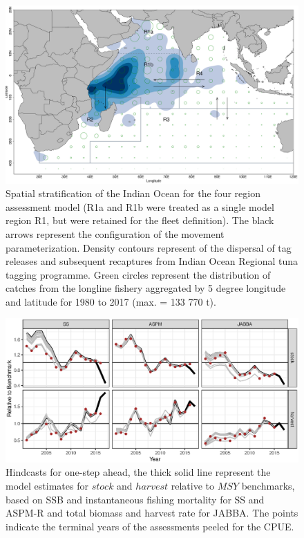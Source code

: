 \documentclass[11pt,a4paper]{article}
\begin{document}
{\begin{figure}[!ht]
\centering
\includegraphics[width=6in]{fig1.eps}
\caption{Spatial stratification of the Indian Ocean for the four region assessment model (R1a and R1b were treated as a single model region R1, but were retained for the fleet definition). The black arrows represent the configuration of the movement parameterization.  Density contours represent of the dispersal of tag releases and subsequent recaptures from Indian Ocean Regional tuna tagging programme. Green circles represent the distribution of catches from the longline fishery aggregated by 5 degree longitude and latitude for 1980 to 2017 (max. = 133 770 t).}
\label{fig:map}
\end{figure}


\begin{figure}
\centering
\includegraphics[width=6in]{fig2.eps}
\caption{Hindcasts for one-step ahead, the thick solid line represent the model estimates for $stock$ and $harvest$ relative to $MSY$ benchmarks, based on SSB and instantaneous fishing mortality for SS and ASPM-R and total biomass and harvest rate for JABBA. The points indicate the terminal years of the assessments peeled for the CPUE.}
\label{fig:retro}
\end{figure}


}
\end{document}
